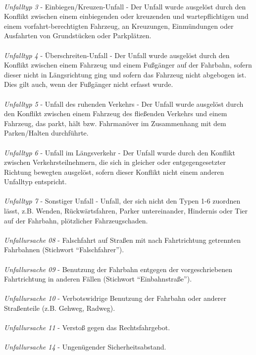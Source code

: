 \\
\textit{Unfalltyp 3} - Einbiegen/Kreuzen-Unfall - Der Unfall wurde ausgelöst durch den Konflikt zwischen einem einbiegenden oder kreuzenden und wartepflichtigen und einem vorfahrt-berechtigten Fahrzeug, an Kreuzungen, Einmündungen oder Ausfahrten von Grundstücken oder Parkplätzen.\\
\\
\textit{Unfalltyp 4} - Überschreiten-Unfall - Der Unfall wurde ausgelöst durch den Konflikt zwischen einem Fahrzeug und einem Fußgänger auf der Fahrbahn, sofern dieser nicht in Längsrichtung ging und sofern das Fahrzeug nicht abgebogen ist. Dies gilt auch, wenn der Fußgänger nicht erfasst wurde.\\
\\
\textit{Unfalltyp 5} - Unfall des ruhenden Verkehrs - Der Unfall wurde ausgelöst durch den Konflikt zwischen einem Fahrzeug des fließenden Verkehrs und einem Fahrzeug, das parkt, hält bzw. Fahrmanöver im Zusammenhang mit dem Parken/Halten durchführte.\\
\\
\textit{Unfalltyp 6} - Unfall im Längsverkehr - Der Unfall wurde durch den Konflikt zwischen Verkehrsteilnehmern, die sich in gleicher oder entgegengesetzter Richtung bewegten ausgelöst, sofern dieser Konflikt nicht einem anderen Unfalltyp entspricht.\\
\\
\textit{Unfalltyp 7} - Sonstiger Unfall - Unfall, der sich nicht den Typen 1-6 zuordnen lässt, z.B. Wenden, Rückwärtsfahren, Parker untereinander, Hindernis oder Tier auf der Fahrbahn, plötzlicher Fahrzeugschaden.\\
\\
\textit{Unfallursache 08} - Falschfahrt auf Straßen mit nach Fahrtrichtung getrennten Fahrbahnen (Stichwort \enquote{Falschfahrer}).\\
\\
\textit{Unfallursache 09} - Benutzung der Fahrbahn entgegen der vorgeschriebenen Fahrtrichtung in anderen Fällen (Stichwort \enquote{Einbahnstraße}).\\
\\
\textit{Unfallursache 10} - Verbotswidrige Benutzung der Fahrbahn oder anderer Straßenteile (z.B. Gehweg, Radweg).\\
\\
\textit{Unfallursache 11} - Verstoß gegen das Rechtsfahrgebot.\\
\\
\textit{Unfallursache 14} - Ungenügender Sicherheitsabstand.\\
